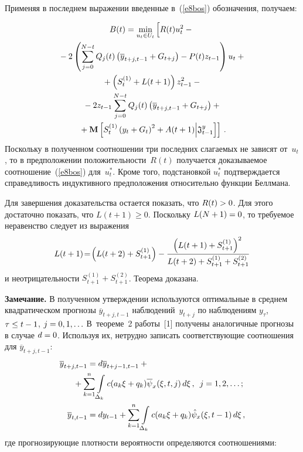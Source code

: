 \begin{multicols}{2}
Применяя в последнем выражении введенные в~(\ref{e8bos}) обозначения, получаем:

\noindent
\begin{multline*}
B(t) =\min\limits_{u_t\in U_t}\left[ \vphantom{S_t^{(1)}}
R(t) u_t^2 -{}\right.\\
{}-2\left( \sum\limits_{j=0}^{N-t} Q_j(t) \left( \overline{y}_{t+j,t-1}+G_{t+j}\right) -
P(t)z_{t-1}\right) u_t+{}\\
{}+ \left(
S_t^{(1)}+L(t+1)\right) z^2_{t-1}-{}\\
{}- 2z_{t-1} \sum\limits_{j=0}^{N-t} Q_j(t)
\left( \overline{y}_{t+j,t-1}+G_{t+j}\right) +{}\\
\left.{}+\mathbf{M}\left[
S_t^{(1)} \left( y_t+G_t\right)^2+A(t+1)\Big\vert \mathfrak{J}^y_{t-1}\right]\right]\,.
\end{multline*}
    Поскольку в полученном соотношении три последних слагаемых не зависят от~$u_t$, то в 
предположении положительности~$R(t)$ получается доказываемое 
соотношение~(\ref{e8bos}) для~$u_t^*$. Кроме того, \mbox{подстановкой} $u_t^*$ подтверждается 
справедливость индуктивного предположения относительно функции Беллмана.
  
  Для завершения доказательства остается показать, что $R(t)\hm>0$. Для этого достаточно 
показать, что $L(t+1)\geq 0$. Поскольку $L(N+1)\hm=0$, то требуемое неравенство следует 
из выражения
  $$
  L(t+1)\! =\!\left( L(t+2)+S_{t+1}^{(1)}\right) -\displaystyle\frac{\displaystyle \left( L(t+1)+S^{(1)}_{t+1}\right)^2\mathstrut}{\displaystyle L(t+2)+S_{t+1}^{(1)}+S^{(2)}_{t+1}\mathstrut}
  $$
и неотрицательности $S_{t+1}^{(1)}+S_{t+1}^{(2)}$. Теорема доказана.
  
  \medskip
  
  \noindent
  \textbf{Замечание.} В полученном утверждении используются оптимальные в среднем 
квадратическом прогнозы $\overline{y}_{t+j,t-1}$ наблюдений~$y_{t+j}$ по наблюдениям 
$y_\tau$, $\tau\hm\leq t-1$, $j\hm=0,1,\ldots$ В~теореме~2 работы~[1] получены аналогичные 
прогнозы в случае $d\hm=0$. Используя их, нетрудно записать соответствующие 
соотношения для $\overline{y}_{t+j,t-1}$:
  \begin{align*}
  \overline{y}_{t+j,t-1} &= d\overline{y}_{t+j-1,t-1}+{}\\
  &\hspace*{-6mm}{}+\sum\limits_{k=1}^n \int\limits_{\Delta_k}
  c(a_k\xi+q_k)\overline{\psi}_x (\xi,t,j)\,d\xi\,,\enskip j=1,2,\ldots;\\
  \overline{y}_{t,t-1} &= dy_{t-1}+\sum\limits_{k=1}^n \int\limits_{\Delta_k} c( a_k\xi + q_k) 
\hat{\psi}_x (\xi,t-1)\,d\xi\,,
  \end{align*}
где прогнозирующие плотности вероятности определяются соотношениями:


\end{multicols}
